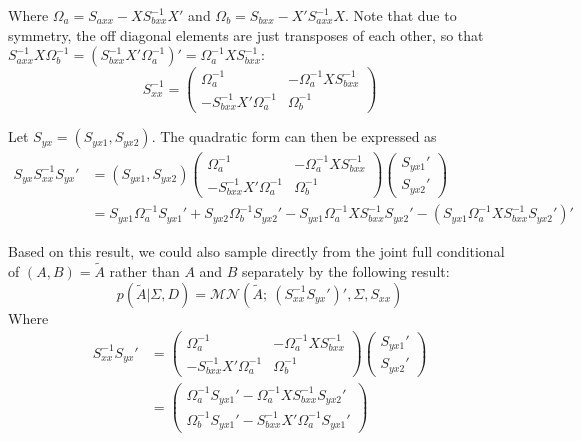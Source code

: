 \documentclass[12pt]{article}
\begin{document}
Where $\Omega_a = S_{axx}-XS_{bxx}^{-1}X'$ and $\Omega_b = S_{bxx}-X'S_{axx}^{-1}X$. Note that due to symmetry, the off diagonal elements are just transposes of each other, so that $S_{axx}^{-1}X\Omega_{b}^{-1}=\left(S_{bxx}^{-1}X'\Omega_{a}^{-1}\right)' = \Omega_a^{-1}XS_{bxx}^{-1}$:
\[S_{xx}^{-1} = \begin{pmatrix}\Omega_a^{-1} & -\Omega_a^{-1}XS_{bxx}^{-1}\\
                -S_{bxx}^{-1}X'\Omega_a^{-1} & \Omega_b^{-1}\end{pmatrix}\]


Let $S_{yx}=(S_{yx1},S_{yx2})$. The quadratic form can then be expressed as
\begin{align*}
S_{yx}S_{xx}^{-1}S_{yx}' &= (S_{yx1},S_{yx2})\begin{pmatrix}\Omega_a^{-1} & -\Omega_a^{-1}XS_{bxx}^{-1}\\-S_{bxx}^{-1}X'\Omega_a^{-1} & \Omega_b^{-1}\end{pmatrix}\begin{pmatrix}S_{yx1}'\\S_{yx2}'\end{pmatrix}\\
&=S_{yx1}\Omega_a^{-1}S_{yx1}'+S_{yx2}\Omega_b^{-1}S_{yx2}'-S_{yx1}\Omega_a^{-1}XS_{bxx}^{-1}S_{yx2}'-\left(S_{yx1}\Omega_a^{-1}XS_{bxx}^{-1}S_{yx2}'\right)'
\end{align*}

Based on this result, we could also sample directly from the joint full conditional of $(A,B)=\tilde{A}$ rather than $A$ and $B$ separately by the following result:
\[p(\tilde{A}|\Sigma,D) = \mathcal{MN}\left(\tilde{A};~(S_{xx}^{-1}S_{yx}')',\Sigma,S_{xx}\right)\]
Where
\begin{align*}
S_{xx}^{-1}S_{yx}' &= \begin{pmatrix}\Omega_a^{-1} & -\Omega_a^{-1}XS_{bxx}^{-1}\\-S_{bxx}^{-1}X'\Omega_a^{-1} & \Omega_b^{-1}\end{pmatrix}\begin{pmatrix}S_{yx1}'\\S_{yx2}'\end{pmatrix}\\
&= \begin{pmatrix}\Omega_a^{-1}S_{yx1}' - \Omega_a^{-1}XS_{bxx}^{-1}S_{yx2}'\\\Omega_b^{-1}S_{yx1}' - S_{bxx}^{-1}X'\Omega_a^{-1}S_{yx1}'\end{pmatrix}
\end{align*}
\end{document}
